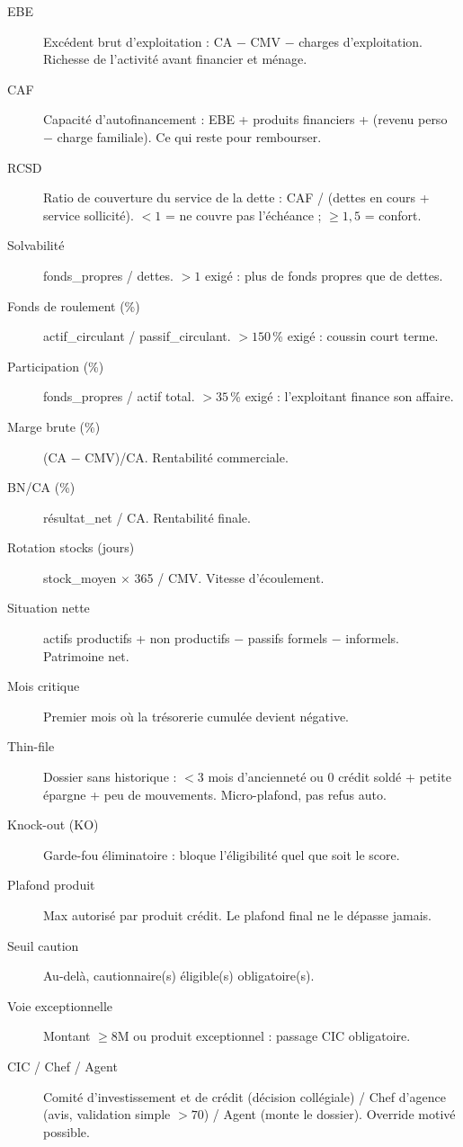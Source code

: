 \documentclass[11pt,a4paper]{article}
\begin{document}
\begin{description}
  \item[EBE] Excédent brut d'exploitation : CA $-$ CMV $-$ charges d'exploitation. Richesse de l'activité avant financier et ménage.
  \item[CAF] Capacité d'autofinancement : EBE + produits financiers + (revenu perso $-$ charge familiale). Ce qui reste pour rembourser.
  \item[RCSD] Ratio de couverture du service de la dette : CAF / (dettes en cours + service sollicité). $<1$ = ne couvre pas l'échéance ; $\geq 1{,}5$ = confort.
  \item[Solvabilité] fonds\_propres / dettes. $>1$ exigé : plus de fonds propres que de dettes.
  \item[Fonds de roulement (\%)] actif\_circulant / passif\_circulant. $>150$\,\% exigé : coussin court terme.
  \item[Participation (\%)] fonds\_propres / actif total. $>35$\,\% exigé : l'exploitant finance son affaire.
  \item[Marge brute (\%)] (CA $-$ CMV)/CA. Rentabilité commerciale.
  \item[BN/CA (\%)] résultat\_net / CA. Rentabilité finale.
  \item[Rotation stocks (jours)] stock\_moyen $\times$ 365 / CMV. Vitesse d'écoulement.
  \item[Situation nette] actifs productifs + non productifs $-$ passifs formels $-$ informels. Patrimoine net.
  \item[Mois critique] Premier mois où la trésorerie cumulée devient négative.
  \item[Thin-file] Dossier sans historique : $<3$ mois d'ancienneté ou 0 crédit soldé + petite épargne + peu de mouvements. Micro-plafond, pas refus auto.
  \item[Knock-out (KO)] Garde-fou éliminatoire : bloque l'éligibilité quel que soit le score.
  \item[Plafond produit] Max autorisé par produit crédit. Le plafond final ne le dépasse jamais.
  \item[Seuil caution] Au-delà, cautionnaire(s) éligible(s) obligatoire(s).
  \item[Voie exceptionnelle] Montant $\geq 8$M ou produit exceptionnel : passage CIC obligatoire.
  \item[CIC / Chef / Agent] Comité d'investissement et de crédit (décision collégiale) / Chef d'agence (avis, validation simple $>70$) / Agent (monte le dossier). Override motivé possible.

\end{description}
\end{document}
